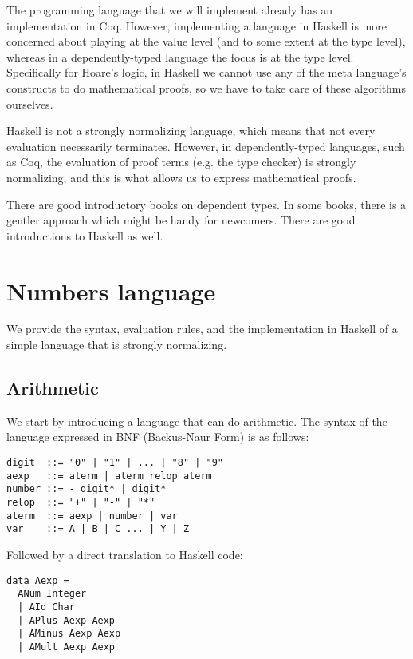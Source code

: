 \documentclass{article}
\theoremstyle{definition}
\begin{document}
The programming language that we will implement already has an implementation in Coq\cite{b3}. However, implementing a language in Haskell is more concerned about playing at the value level (and to some extent at the type level), whereas in a dependently-typed language the focus is at the type level. Specifically for Hoare's logic, in Haskell we cannot use any of the meta language's constructs to do mathematical proofs, so we have to take care of these algorithms ourselves.

Haskell is not a strongly normalizing language, which means that not every evaluation necessarily terminates. However, in dependently-typed languages, such as Coq\cite{b4}, the evaluation of proof terms (e.g. the type checker) is strongly normalizing, and this is what allows us to express mathematical proofs.

There are good introductory books on dependent types\cite{b3}. In some books, there is a gentler approach which might be handy for newcomers\cite{b5}. There are good introductions to Haskell as well\cite{b6}.

\section{Numbers language}

We provide the syntax, evaluation rules, and the implementation in Haskell of a simple language that is strongly normalizing.

\subsection{Arithmetic}

We start by introducing a language that can do arithmetic. The syntax of the language expressed in BNF (Backus-Naur Form) is as follows:

\begin{lstlisting}
digit  ::= "0" | "1" | ... | "8" | "9"
aexp   ::= aterm | aterm relop aterm
number ::= - digit* | digit*
relop  ::= "+" | "-" | "*"
aterm  ::= aexp | number | var
var    ::= A | B | C ... | Y | Z
\end{lstlisting}

Followed by a direct translation to Haskell code:

\begin{lstlisting}
data Aexp =
  ANum Integer
  | AId Char
  | APlus Aexp Aexp
  | AMinus Aexp Aexp
  | AMult Aexp Aexp
\end{lstlisting}
\end{document}
